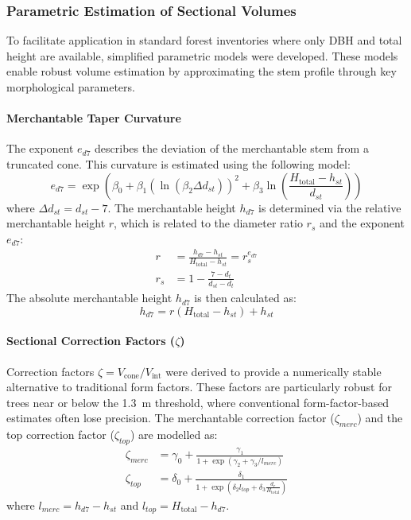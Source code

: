 \documentclass[twocolumn, bibliography=totoc]{scrartcl}
\begin{document}
\subsubsection{Parametric Estimation of Sectional Volumes}

To facilitate application in standard forest inventories where only DBH and total height are available, simplified parametric models were developed. These models enable robust volume estimation by approximating the stem profile through key morphological parameters.

\paragraph{Merchantable Taper Curvature}
The exponent $e_{d7}$ describes the deviation of the merchantable stem from a truncated cone. This curvature is estimated using the following model:
\begin{equation}
e_{d7} = \exp\left( \beta_0 + \beta_1 \left( \ln(\beta_2 \Delta d_{st}) \right)^2 + \beta_3 \ln\left( \frac{H_{\text{total}} - h_{st}}{d_{st}} \right) \right)
\end{equation}
where $\Delta d_{st} = d_{st} - 7$. The merchantable height $h_{d7}$ is determined via the relative merchantable height $r$, which is related to the diameter ratio $r_s$ and the exponent $e_{d7}$:
\begin{align}
r &= \frac{h_{d7} - h_{st}}{H_{\text{total}} - h_{st}} = r_s^{e_{d7}} \\
r_s &= 1 - \frac{7 - d_t}{d_{st} - d_t}
\end{align}
The absolute merchantable height $h_{d7}$ is then calculated as:
\begin{equation}
h_{d7} = r (H_{\text{total}} - h_{st}) + h_{st}
\end{equation}

\paragraph{Sectional Correction Factors ($\zeta$)}
Correction factors $\zeta = V_{\text{cone}} / V_{\text{int}}$ were derived to provide a numerically stable alternative to traditional form factors. These factors are particularly robust for trees near or below the \qty{1.3}{m} threshold, where conventional form-factor-based estimates often lose precision. The merchantable correction factor ($\zeta_{merc}$) and the top correction factor ($\zeta_{top}$) are modelled as:
\begin{align}
\zeta_{merc} &= \gamma_0 + \frac{\gamma_1}{1 + \exp\left( \gamma_2 + \gamma_3 / l_{merc} \right)} \\
\zeta_{top} &= \delta_0 + \frac{\delta_1}{1 + \exp\left( \delta_2 l_{top} + \delta_3 \frac{d_r}{H_{\text{total}}} \right)}
\end{align}
where $l_{merc} = h_{d7} - h_{st}$ and $l_{top} = H_{\text{total}} - h_{d7}$.
\end{document}
